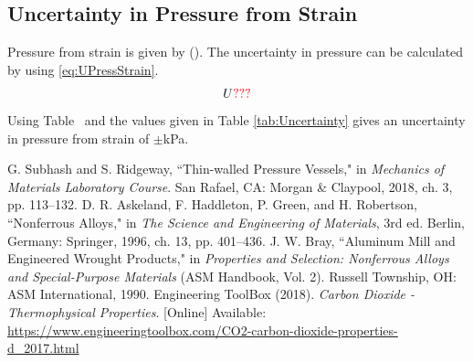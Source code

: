 \documentclass[10pt,journal,letterpaper]{IEEEtran}
\begin{document}
\subsection*{Uncertainty in Pressure from Strain}

Pressure from strain is given by (\todo).
The uncertainty in pressure can be calculated by using \eqref{eq:UPressStrain}.
\begin{equation}
\label{eq:UPressStrain}
U\textcolor{red}{???}
\end{equation}
Using Table \todo\ and the values given in Table \ref{tab:Uncertainty} gives an uncertainty in pressure from strain of $\pm$\todo kPa.


\begin{thebibliography}{00}
 G. Subhash and S. Ridgeway, ``Thin-walled Pressure Vessels," in \textit{Mechanics of Materials Laboratory Course}. San Rafael, CA: Morgan \& Claypool, 2018, ch. 3, pp. 113--132.
 D. R. Askeland, F. Haddleton, P. Green, and H. Robertson, ``Nonferrous Alloys," in \textit{The Science and Engineering of Materials}, 3rd ed. Berlin, Germany: Springer, 1996, ch. 13, pp. 401--436.
 J. W. Bray, ``Aluminum Mill and Engineered Wrought Products," in \textit{Properties and Selection: Nonferrous Alloys and Special-Purpose Materials} (ASM Handbook, Vol. 2). Russell Township, OH: ASM International, 1990.
 Engineering ToolBox (2018). \textit{Carbon Dioxide - Thermophysical Properties}. [Online] Available: \url{https://www.engineeringtoolbox.com/CO2-carbon-dioxide-properties-d_2017.html}
\end{thebibliography}
\end{document}
